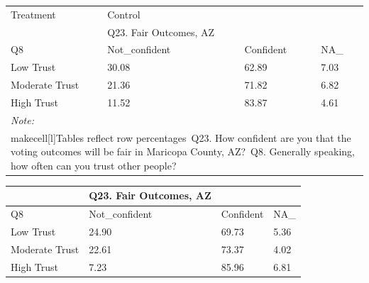 \documentclass[
  11pt,
  a4paper,
]{article}
\begin{document}
\begin{table}
\centering
\centering
\begin{tabular}[t]{l|l|l|l}
\hline
\multicolumn{1}{l|}{Treatment} & \multicolumn{1}{l}{Control} \\
\cline{1-1} \cline{2-2}
 & Q23. Fair Outcomes, AZ &  & \\
\hline
Q8 & Not\_confident & Confident & NA\_\\
\hline
Low Trust & 30.08 & 62.89 & 7.03\\
\hline
Moderate Trust & 21.36 & 71.82 & 6.82\\
\hline
High Trust & 11.52 & 83.87 & 4.61\\
\hline
\multicolumn{4}{l}{\rule{0pt}{1em}\textit{Note: }}\\
\multicolumn{4}{l}{\rule{0pt}{1em}makecell[l]{Tables reflect row percentages\ Q23. How confident are you that the voting outcomes will be fair in Maricopa County, AZ?\ Q8. Generally speaking, how often can you trust other people?}}\\
\end{tabular}
\centering
\begin{tabular}[t]{l|l|l|l}
\hline
 & Q23. Fair Outcomes, AZ &  & \\
\hline
Q8 & Not\_confident & Confident & NA\_\\
\hline
Low Trust & 24.90 & 69.73 & 5.36\\
\hline
Moderate Trust & 22.61 & 73.37 & 4.02\\
\hline
High Trust & 7.23 & 85.96 & 6.81\\
\hline
\end{tabular}
\end{table}
\end{document}
